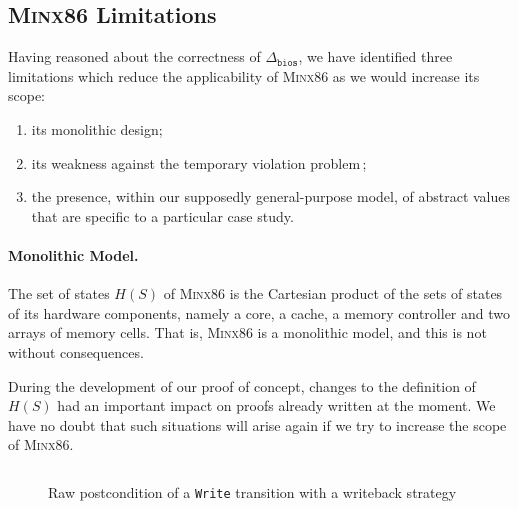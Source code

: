 \subsection{{\scshape Minx86} Limitations}
\label{subsec:freespec:minx86lim}

Having reasoned about the correctness of \( \Delta_{\mathtt{bios}} \), we have
identified three limitations which reduce the applicability of {\scshape Minx86}
as we would increase its scope: 
\begin{enumerate}
\item its monolithic design;
\item  its weakness against the temporary violation problem\,\cite{muller2006tempviolation};
\item the presence, within our supposedly general-purpose model, of abstract values that are specific to a particular case study.
\end{enumerate}

\paragraph{Monolithic Model.}
%
The set of states \( H(S) \) of {\scshape Minx86} is the Cartesian product of
the sets of states of its hardware components, namely a core, a cache, a memory
controller and two arrays of memory cells.
%
That is, {\scshape Minx86} is a monolithic model, and this is not without
consequences.

During the development of our proof of concept, changes to the definition of
\( H(S) \) had an important impact on proofs already written at the moment.
%
We have no doubt that such situations will arise again if we try to increase the
scope of {\scshape Minx86}.

\begin{figure}
  \inputminted{coq}{Listings/StateHell.v}

  \caption{Raw postcondition of a \texttt{Write} transition with a writeback
    strategy}
  \label{fig:freespec:entrypoint}
\end{figure}

